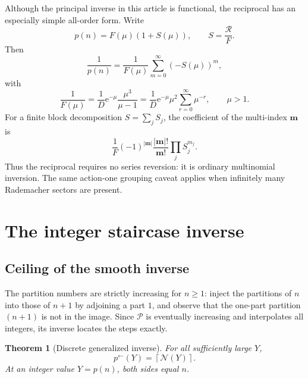 \documentclass[11pt]{article}
\numberwithin{equation}{section}
\theoremstyle{mainthm}
\newtheorem{theorem}{Theorem}[section]
\theoremstyle{defstyle}
\theoremstyle{remark}
\newcommand{\e}{\mathrm e}
\newcommand{\ceil}[1]{\left\lceil#1\right\rceil}
\newcommand{\Rtail}{\mathcal R}
\newcommand{\Pcal}{\mathcal P}
\newcommand{\Ncal}{\mathcal N}
\begin{document}
Although the principal inverse in this article is functional, the reciprocal has an especially simple all-order form.  Write
\begin{equation}\label{eq:S-relative}
 p(n)=F(\mu)(1+S(\mu)),
 \qquad
 S=\frac{\Rtail}{F}.
\end{equation}
Then
\begin{equation}\label{eq:reciprocal-master}
 \frac1{p(n)}=\frac1{F(\mu)}\sum_{m=0}^{\infty}(-S(\mu))^m,
\end{equation}
with
\begin{equation}\label{eq:inverse-F-reciprocal}
 \frac1{F(\mu)}=\frac1D\e^{-\mu}\frac{\mu^3}{\mu-1}
 =\frac1D\e^{-\mu}\mu^2\sum_{r=0}^{\infty}\mu^{-r},
 \qquad \mu>1.
\end{equation}
For a finite block decomposition \(S=\sum_jS_j\), the coefficient of the multi-index \(\bm m\) is
\begin{equation}\label{eq:reciprocal-multi}
 \frac1F(-1)^{|\bm m|}
 \frac{|\bm m|!}{\bm m!}\prod_jS_j^{m_j}.
\end{equation}
Thus the reciprocal requires no series reversion: it is ordinary multinomial inversion.  The same action-one grouping caveat applies when infinitely many Rademacher sectors are present.

\section{The integer staircase inverse}\label{sec:staircase}

\subsection{Ceiling of the smooth inverse}

The partition numbers are strictly increasing for \(n\ge1\): inject the partitions of \(n\) into those of \(n+1\) by adjoining a part \(1\), and observe that the one-part partition \((n+1)\) is not in the image.  Since \(\Pcal\) is eventually increasing and interpolates all integers, its inverse locates the steps exactly.

\begin{theorem}[Discrete generalized inverse]\label{thm:staircase-ceiling}
For all sufficiently large \(Y\),
\begin{equation}\label{eq:staircase-ceiling}
 \boxed{
 p^{\leftarrow}(Y)=\ceil{\Ncal(Y)}.}
\end{equation}
At an integer value \(Y=p(n)\), both sides equal \(n\).
\end{theorem}
\end{document}
